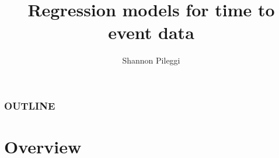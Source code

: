



\title[Set 8]{Regression models for time to event data}
\author[Pileggi]{Shannon Pileggi}


\date{}




\begin{frame}
\titlepage
\end{frame}

\begin{frame}
\frametitle{OUTLINE\qquad\qquad\qquad} \tableofcontents[hideallsubsections]
\end{frame}


\section[Overview]{Overview}
\subsection{}

